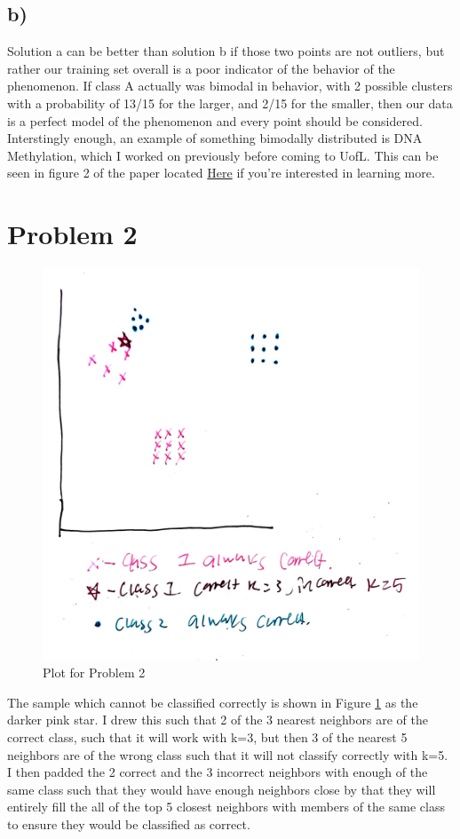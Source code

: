 \documentclass[12pt]{article}
\begin{document}
\subsection{b)}
Solution a can be better than solution b if those two points are not outliers, but rather our training set overall is 
a poor indicator of the behavior of the phenomenon. If class A actually was bimodal in behavior, with 2 possible clusters 
with a probability of 13/15 for the larger, and 2/15 for the smaller, then our data is a perfect model of the phenomenon 
and every point should be considered. Interstingly enough, an example of something bimodally distributed is DNA Methylation,
which I worked on previously before coming to UofL. This can be seen in figure 2 of the paper located 
\href{https://bmcbioinformatics.biomedcentral.com/articles/10.1186/1471-2105-11-587}{Here}
if you're interested in learning more. 


\section{Problem 2}
\begin{figure}
  \includegraphics[width=.65\textwidth]{../results/Prob_2_plot.PNG}
  \caption{Plot for Problem 2}
  \label{image2}
\end{figure}

The sample which cannot be classified correctly is shown in Figure \ref{image2} as the darker pink star. I drew this
such that 2 of the 3 nearest neighbors are of the correct class, such that it will work with k=3, but then 3 of the nearest
5 neighbors are of the wrong class such that it will not classify correctly with k=5. I then padded the 2 correct and the 
3 incorrect neighbors with enough of the same class such that they would have enough neighbors close by that they will 
entirely fill the all of the top 5 closest neighbors with members of the same class to ensure they would be classified as 
correct. 
\end{document}
